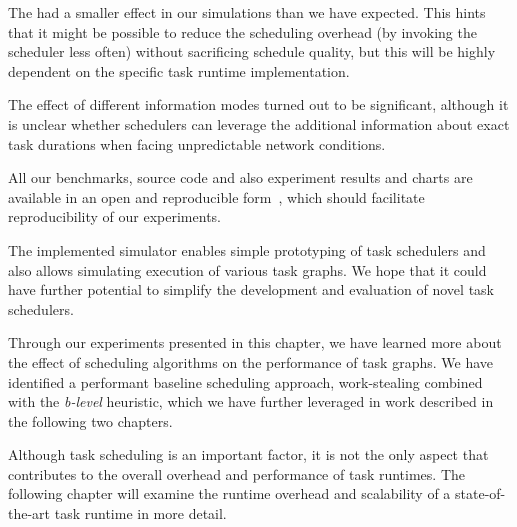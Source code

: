 The  had a smaller effect in our simulations than we have expected. This
hints that it might be possible to reduce the scheduling overhead (by invoking the scheduler less
often) without sacrificing schedule quality, but this will be highly dependent on the specific task
runtime implementation.

The effect of different information modes turned out to be significant, although it is unclear
whether schedulers can leverage the additional information about exact task durations when facing
unpredictable network conditions.

All our benchmarks, source code and also experiment results and charts are available in an open
and reproducible form~\cite{estee_graphs, estee_results}, which should facilitate
reproducibility of our experiments.

The implemented \estee{} simulator enables simple prototyping of task schedulers and
also allows simulating execution of various task graphs. We hope that it could have further
potential to simplify the development and evaluation of novel task schedulers.

Through our experiments presented in this chapter, we have learned more about the effect of
scheduling algorithms on the performance of task graphs. We have identified a performant baseline
scheduling approach, work-stealing combined with the \emph{b-level} heuristic, which we
have further leveraged in work described in the following two chapters.

Although task scheduling is an important factor, it is not the only aspect that contributes to the
overall overhead and performance of task runtimes. The following chapter will examine the runtime
overhead and scalability of a state-of-the-art task runtime in more detail.
